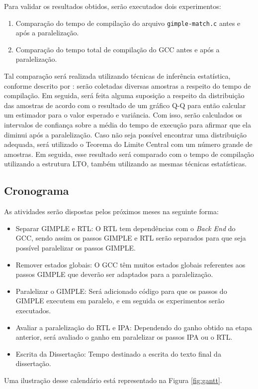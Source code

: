 Para validar os resultados obtidos, serão executados dois experimentos:
\begin{enumerate}
    \item Comparação do tempo de compilação do arquivo \texttt{gimple-match.c}
        antes e após a paralelização.


    \item Comparação do tempo total de compilação do GCC antes e após a paralelização.
\end{enumerate}
Tal comparação será realizada utilizando
técnicas de inferência estatística, conforme descrito por
\cite{morettin2017estatistica}: serão
coletadas diversas amostras a respeito do tempo de compilação. Em seguida, será feita alguma suposição a respeito da distribuição
das amostras de acordo com o resultado de um gráfico Q-Q para então calcular um estimador
para o valor esperado e variância. Com isso, serão calculados os intervalos de confiança
sobre a média do tempo de execução para afirmar que ela diminui após a paralelização. Caso
não seja possível encontrar uma distribuição adequada, será utilizado o Teorema do Limite
Central com um número grande de amostras. Em seguida, esse resultado será comparado com o
tempo de compilação utilizando a estrutura LTO, também utilizando as mesmas técnicas estatísticas.

\subsection{Cronograma}

As atividades serão dispostas pelos próximos meses na seguinte forma:

\begin{itemize}
	\item Separar GIMPLE e RTL: O RTL tem dependências com o \textit{Back End}
	do GCC, sendo assim os passos GIMPLE e RTL serão separados para que seja
	possível paralelizar os passos GIMPLE.

	\item Remover estados globais: O GCC têm muitos estados globais referentes
	aos passos GIMPLE que deverão ser adaptados para a paralelização.

	\item Paralelizar o GIMPLE: Será adicionado código para que os passos do
	GIMPLE executem em paralelo, e em seguida os experimentos serão executados.

	\item Avaliar a paralelização do RTL e IPA: Dependendo do ganho obtido
	na etapa anterior, será avaliado o ganho em paralelizar os passos IPA ou
	o RTL.

	\item Escrita da Dissertação: Tempo destinado a escrita do texto final da
        dissertação.
\end{itemize}
Uma ilustração desse calendário está representado na Figura \ref{fig:gantt}.

